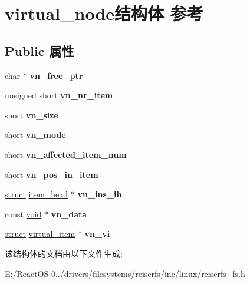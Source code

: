 \hypertarget{structvirtual__node}{}\section{virtual\+\_\+node结构体 参考}
\label{structvirtual__node}
\subsection*{Public 属性}
\begin{DoxyCompactItemize}
\item 
\mbox{\label{structvirtual__node_ac5016c0fdc974c07b0e03b9b8989b9a6}} 
char $\ast$ {\bfseries vn\+\_\+free\+\_\+ptr}
\item 
\mbox{\label{structvirtual__node_aaba873b72aaa89ad51b003d7be0d95b7}} 
unsigned short {\bfseries vn\+\_\+nr\+\_\+item}
\item 
\mbox{\label{structvirtual__node_a7a265c6552d8841ff3f11c46df30eddf}} 
short {\bfseries vn\+\_\+size}
\item 
\mbox{\label{structvirtual__node_a14622e4ec69d16502d7d0b18f1531c6d}} 
short {\bfseries vn\+\_\+mode}
\item 
\mbox{\label{structvirtual__node_a24afa0271d5f5c5f4842d2280848fd08}} 
short {\bfseries vn\+\_\+affected\+\_\+item\+\_\+num}
\item 
\mbox{\label{structvirtual__node_afce3b63859a4980feb1871bbceb572f1}} 
short {\bfseries vn\+\_\+pos\+\_\+in\+\_\+item}
\item 
\mbox{\label{structvirtual__node_a02877675233a49f4d212a1f36484aa88}} 
\hyperlink{interfacestruct}{struct} \hyperlink{structitem__head}{item\+\_\+head} $\ast$ {\bfseries vn\+\_\+ins\+\_\+ih}
\item 
\mbox{\label{structvirtual__node_a2e97e12468eb6c066b8c83e0bfd79bec}} 
const \hyperlink{interfacevoid}{void} $\ast$ {\bfseries vn\+\_\+data}
\item 
\mbox{\label{structvirtual__node_a1a24b0db05c384d92345df349af5fa79}} 
\hyperlink{interfacestruct}{struct} \hyperlink{structvirtual__item}{virtual\+\_\+item} $\ast$ {\bfseries vn\+\_\+vi}
\end{DoxyCompactItemize}


该结构体的文档由以下文件生成\+:\begin{DoxyCompactItemize}
\item 
E\+:/\+React\+O\+S-\/0../drivers/filesystems/reiserfs/inc/linux/reiserfs\+\_\+fs.\+h\end{DoxyCompactItemize}
